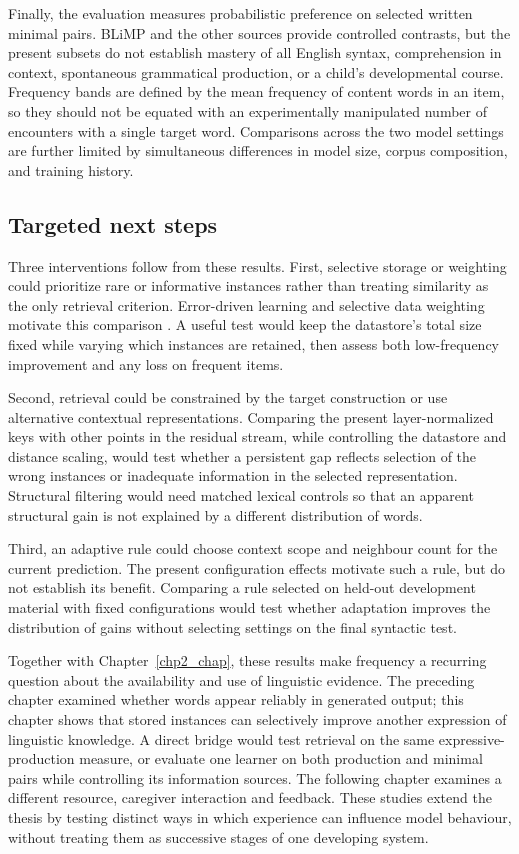 Finally, the evaluation measures probabilistic preference on selected written minimal pairs. BLiMP and the other sources provide controlled contrasts, but the present subsets do not establish mastery of all English syntax, comprehension in context, spontaneous grammatical production, or a child's developmental course. Frequency bands are defined by the mean frequency of content words in an item, so they should not be equated with an experimentally manipulated number of encounters with a single target word. Comparisons across the two model settings are further limited by simultaneous differences in model size, corpus composition, and training history.

\subsection{Targeted next steps}

Three interventions follow from these results. First, selective storage or weighting could prioritize rare or informative instances rather than treating similarity as the only retrieval criterion. Error-driven learning and selective data weighting motivate this comparison \citep{chang2006dual,rescorla1972theory,toneva2018empirical,xie2023doremi}. A useful test would keep the datastore's total size fixed while varying which instances are retained, then assess both low-frequency improvement and any loss on frequent items.

Second, retrieval could be constrained by the target construction or use alternative contextual representations. Comparing the present layer-normalized keys with other points in the residual stream, while controlling the datastore and distance scaling, would test whether a persistent gap reflects selection of the wrong instances or inadequate information in the selected representation. Structural filtering would need matched lexical controls so that an apparent structural gain is not explained by a different distribution of words.

Third, an adaptive rule could choose context scope and neighbour count for the current prediction. The present configuration effects motivate such a rule, but do not establish its benefit. Comparing a rule selected on held-out development material with fixed configurations would test whether adaptation improves the distribution of gains without selecting settings on the final syntactic test.

Together with Chapter~\ref{chp2_chap}, these results make frequency a recurring question about the availability and use of linguistic evidence. The preceding chapter examined whether words appear reliably in generated output; this chapter shows that stored instances can selectively improve another expression of linguistic knowledge. A direct bridge would test retrieval on the same expressive-production measure, or evaluate one learner on both production and minimal pairs while controlling its information sources. The following chapter examines a different resource, caregiver interaction and feedback. These studies extend the thesis by testing distinct ways in which experience can influence model behaviour, without treating them as successive stages of one developing system.
